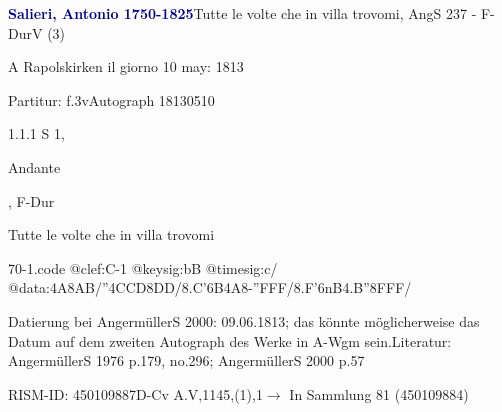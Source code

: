 \documentclass[a4paper, twocolumn, 11pt]{book}
\begin{document}
\par \vspace{16pt} \textcolor{darkblue}{\textbf{Salieri, Antonio  1750-1825}}\hfillplus{[70]}\newline Tutte le volte che in villa trovomi, AngS 237 - F-Dur\newline V (3)
\par \begin{itshape} A Rapolskirken il giorno 10 may: 1813\end{itshape} 
\par \textcolor{darkblue}{}  Partitur: f.3v\newline Autograph  18130510
\par 1.1.1  S 1, \begin{itshape}Andante\end{itshape}, F-Dur\newline \begin{footnotesize} Tutte le volte che in villa trovomi \end{footnotesize}  
\begin{filecontents*}{70-1.code}
@clef:C-1
@keysig:bB
@timesig:c/
@data:4A8AB/''4CCD8DD/8.C'6B4A8-''FFF/8.F'6nB4.B''8FFF/
\end{filecontents*}
\newline %
\par Datierung bei AngermüllerS 2000: 09.06.1813; das könnte möglicherweise das Datum auf dem zweiten Autograph des Werke in A-Wgm sein.\newline Literatur: AngermüllerS 1976  p.179, no.296; AngermüllerS 2000  p.57
\par RISM-ID: 450109887\newline D-Cv  A.V,1145,(1),1\newline $\rightarrow$ In Sammlung 81 (450109884)
      
\end{document}
